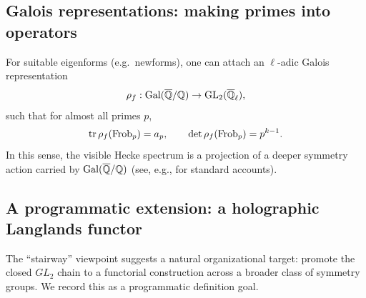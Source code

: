 \subsection{Galois representations: making primes into operators}
\label{sec:galois_representations}

For suitable eigenforms (e.g.\ newforms), one can attach an $\ell$-adic Galois representation
\begin{equation}
\rho_f:\mathrm{Gal}(\overline{\mathbb{Q}}/\mathbb{Q})\to \mathrm{GL}_2(\overline{\mathbb{Q}}_\ell),
\end{equation}
such that for almost all primes $p$,
\begin{equation}
\mathrm{tr}\,\rho_f(\mathrm{Frob}_p)=a_p,\qquad \det \rho_f(\mathrm{Frob}_p)=p^{k-1}.
\end{equation}
In this sense, the visible Hecke spectrum is a projection of a deeper symmetry action carried by $\mathrm{Gal}(\overline{\mathbb{Q}}/\mathbb{Q})$ (see, e.g., \cite{Deligne1971Bourbaki,Serre1973,Harris2014SatoTate} for standard accounts).

\subsection{A programmatic extension: a holographic Langlands functor}
\label{sec:holographic_langlands_functor}

The ``stairway'' viewpoint suggests a natural organizational target: promote the closed $GL_2$ chain to a functorial construction across a broader class of symmetry groups.
We record this as a programmatic definition goal.

